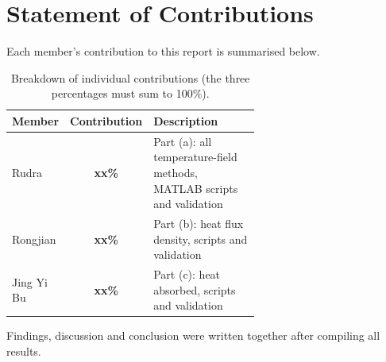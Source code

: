 \section*{Statement of Contributions}

Each member's contribution to this report is summarised below.

\begin{table}[H]
\centering
\begin{tabular}{lcp{0.62\linewidth}}
\toprule
\textbf{Member} & \textbf{Contribution} & \textbf{Description} \\
\midrule
Rudra & \textcolor{red!70!black}{\textbf{xx\%}} & Part (a): all temperature-field methods, MATLAB scripts and validation \\
Rongjian & \textcolor{red!70!black}{\textbf{xx\%}} & Part (b): heat flux density, scripts and validation \\
Jing Yi Bu & \textcolor{red!70!black}{\textbf{xx\%}} & Part (c): heat absorbed, scripts and validation \\
\bottomrule
\end{tabular}
\caption{Breakdown of individual contributions (the three percentages must sum to 100\%).}
\end{table}

\noindent Findings, discussion and conclusion were written together after compiling all results.

\bigskip
\tableofcontents
\clearpage
